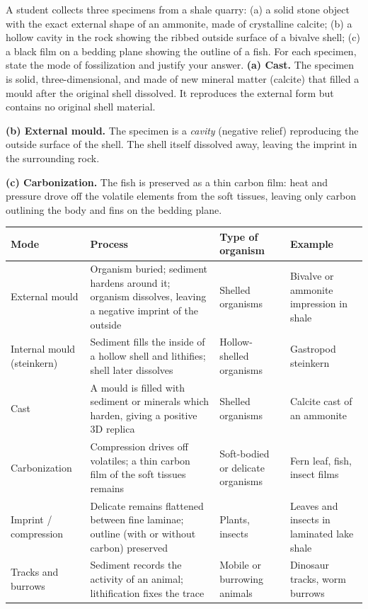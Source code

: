 \documentclass[11pt]{article}
\begin{document}
\begin{exoresolu}
A student collects three specimens from a shale quarry: (a) a solid stone object with the exact external shape of an ammonite, made of crystalline calcite; (b) a hollow cavity in the rock showing the ribbed outside surface of a bivalve shell; (c) a black film on a bedding plane showing the outline of a fish. For each specimen, state the mode of fossilization and justify your answer.
\tcblower
\textbf{(a) Cast.} The specimen is solid, three-dimensional, and made of new mineral matter (calcite) that filled a mould after the original shell dissolved. It reproduces the external form but contains no original shell material.

\textbf{(b) External mould.} The specimen is a \emph{cavity} (negative relief) reproducing the outside surface of the shell. The shell itself dissolved away, leaving the imprint in the surrounding rock.

\textbf{(c) Carbonization.} The fish is preserved as a thin carbon film: heat and pressure drove off the volatile elements from the soft tissues, leaving only carbon outlining the body and fins on the bedding plane.
\end{exoresolu}

\begin{aretenir}
\begin{center}
\begin{tabularx}{\linewidth}{|l|X|l|l|}
\hline
\rowcolor{popblueL} \textbf{Mode} & \textbf{Process} & \textbf{Type of organism} & \textbf{Example} \\
\hline
External mould & Organism buried; sediment hardens around it; organism dissolves, leaving a negative imprint of the outside & Shelled organisms & Bivalve or ammonite impression in shale \\
\hline
Internal mould (steinkern) & Sediment fills the inside of a hollow shell and lithifies; shell later dissolves & Hollow-shelled organisms & Gastropod steinkern \\
\hline
Cast & A mould is filled with sediment or minerals which harden, giving a positive 3D replica & Shelled organisms & Calcite cast of an ammonite \\
\hline
Carbonization & Compression drives off volatiles; a thin carbon film of the soft tissues remains & Soft-bodied or delicate organisms & Fern leaf, fish, insect films \\
\hline
Imprint / compression & Delicate remains flattened between fine laminae; outline (with or without carbon) preserved & Plants, insects & Leaves and insects in laminated lake shale \\
\hline
Tracks and burrows & Sediment records the activity of an animal; lithification fixes the trace & Mobile or burrowing animals & Dinosaur tracks, worm burrows \\
\hline
\end{tabularx}
\end{center}
\end{aretenir}
\end{document}
